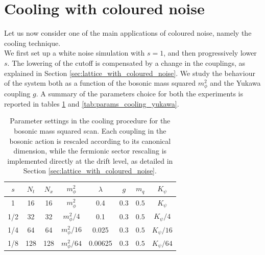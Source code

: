 \section{Cooling with coloured noise}
Let us now consider one of the main applications of coloured noise, namely the cooling technique. \\
We first set up a white noise simulation with $s=1$, and then progressively lower $s$. The lowering of the cutoff is compensated by a change in the couplings, as explained in Section \ref{sec:lattice_with_coloured_noise}. 
We study the behaviour of the system both as a function of the bosonic mass squared $m_\phi^2$ and the Yukawa coupling $g$. 
A summary of the parameters choice for both the experiments is reported in tables \ref{tab:params_cooling} and \ref{tab:params_cooling_yukawa}.
\begin{table}[htp]
    \centering
    \begin{tabular}{cccccccc}
        \toprule
        $s$ & $N_t$ & $N_x$ & $m_\phi^2$ & $\lambda$ & $g$ & $m_q$& $K_\psi$ \\
        \midrule 
        1 & 16 & 16 & $m_\phi^2$ & 0.4 & 0.3 & $0.5$ & $K_\psi$ \\
        1/2 & 32 & 32 & $m_\phi^2/4$ & 0.1 & 0.3 & $0.5$ & $K_\psi/4$ \\
        1/4 & 64 & 64 & $m_\phi^2/16$ & 0.025 & 0.3 & $0.5$ & $K_\psi/16$ \\
        1/8 & 128 & 128 & $m_\phi^2/64$ & 0.00625 & 0.3 & $0.5$ & $K_\psi/64$ \\
        \bottomrule
    \end{tabular}
    \caption[Parameter settings in the cooling procedure for the bosonic mass squared scan]{Parameter settings in the cooling procedure for the bosonic mass squared scan. Each coupling in the bosonic action is rescaled according to its canonical dimension, while the fermionic sector rescaling is implemented directly at the drift level, as detailed in Section \ref{sec:lattice_with_coloured_noise}.}
    \label{tab:params_cooling}
\end{table}
